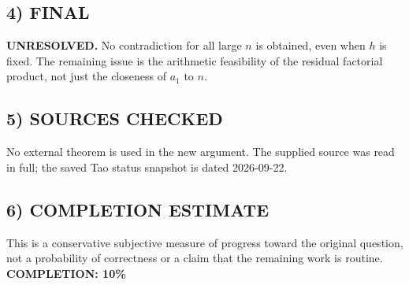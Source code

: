 \subsection{4) FINAL}
\textbf{UNRESOLVED.}
No contradiction for all large $n$ is obtained, even when $h$ is fixed. The remaining issue is the arithmetic feasibility of the residual factorial product, not just the closeness of $a_1$ to $n$.
\subsection{5) SOURCES CHECKED}
No external theorem is used in the new argument. The supplied source was read in full; the saved Tao status snapshot is dated 2026-09-22.
\subsection{6) COMPLETION ESTIMATE}
This is a conservative subjective measure of progress toward the original question, not a probability of correctness or a claim that the remaining work is routine.
\textbf{COMPLETION: 10\%}
